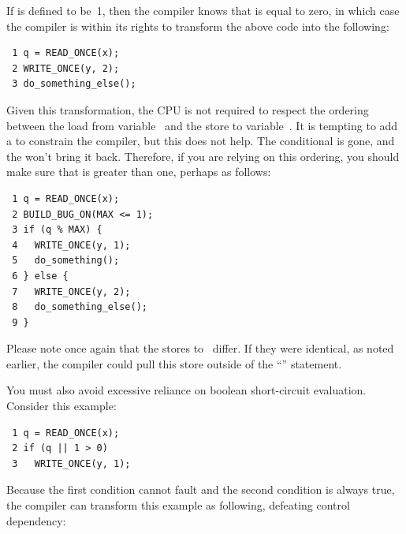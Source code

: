 If  is defined to be~1, then the compiler knows that  is
equal to zero, in which case the compiler is within its rights to
transform the above code into the following:

\vspace{5pt}
\begin{minipage}[t]{\columnwidth}
\scriptsize
\begin{verbatim}
 1 q = READ_ONCE(x);
 2 WRITE_ONCE(y, 2);
 3 do_something_else();
\end{verbatim}
\end{minipage}
\vspace{5pt}

Given this transformation, the CPU is not required to respect the ordering
between the load from variable~ and the store to variable~.
It is tempting to add a  to constrain the compiler,
but this does not help.
The conditional is gone, and the  won't bring it back.
Therefore, if you are relying on this ordering, you should make sure
that  is greater than one, perhaps as follows:

\vspace{5pt}
\begin{minipage}[t]{\columnwidth}
\scriptsize
\begin{verbatim}
 1 q = READ_ONCE(x);
 2 BUILD_BUG_ON(MAX <= 1);
 3 if (q % MAX) {
 4   WRITE_ONCE(y, 1);
 5   do_something();
 6 } else {
 7   WRITE_ONCE(y, 2);
 8   do_something_else();
 9 }
\end{verbatim}
\end{minipage}
\vspace{5pt}

Please note once again that the stores to~ differ.
If they were identical, as noted earlier, the compiler could pull this
store outside of the ``'' statement.

You must also avoid excessive reliance on boolean short-circuit evaluation.
Consider this example:

\vspace{5pt}
\begin{minipage}[t]{\columnwidth}
\scriptsize
\begin{verbatim}
 1 q = READ_ONCE(x);
 2 if (q || 1 > 0)
 3   WRITE_ONCE(y, 1);
\end{verbatim}
\end{minipage}
\vspace{5pt}

Because the first condition cannot fault and the second condition is
always true, the compiler can transform this example as following,
defeating control dependency:

